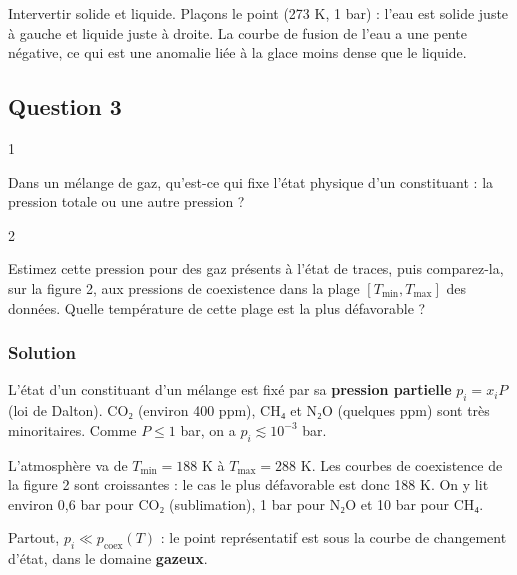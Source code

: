 \documentclass[11pt,a4paper]{article}
\begin{document}
\begin{piege}

Intervertir solide et liquide. Plaçons le point (273 K, 1 bar) : l'eau est solide juste à gauche et liquide juste à droite. La courbe de fusion de l'eau a une pente négative, ce qui est une anomalie liée à la glace moins dense que le liquide.

\end{piege}

\hypertarget{question-3}{%
\subsection{Question 3}\label{question-3}}

\begin{indication}{1}

Dans un mélange de gaz, qu'est-ce qui fixe l'état physique d'un constituant : la pression totale ou une autre pression ?

\end{indication}

\begin{indication}{2}

Estimez cette pression pour des gaz présents à l'état de traces, puis comparez-la, sur la figure 2, aux pressions de coexistence dans la plage \([T_{\min},T_{\max}]\) des données. Quelle température de cette plage est la plus défavorable ?

\end{indication}

\hypertarget{solution-2}{%
\subsubsection{Solution}\label{solution-2}}

L'état d'un constituant d'un mélange est fixé par sa \textbf{pression partielle} \(p_i=x_iP\) (loi de Dalton). CO₂ (environ 400 ppm), CH₄ et N₂O (quelques ppm) sont très minoritaires. Comme \(P\le1\) bar, on a \(p_i\lesssim10^{-3}\) bar.

L'atmosphère va de \(T_{\min}=188\) K à \(T_{\max}=288\) K. Les courbes de coexistence de la figure 2 sont croissantes : le cas le plus défavorable est donc 188 K. On y lit environ 0,6 bar pour CO₂ (sublimation), 1 bar pour N₂O et 10 bar pour CH₄.

Partout, \(p_i\ll p_{\text{coex}}(T)\) : le point représentatif est sous la courbe de changement d'état, dans le domaine \textbf{gazeux}.
\end{document}
